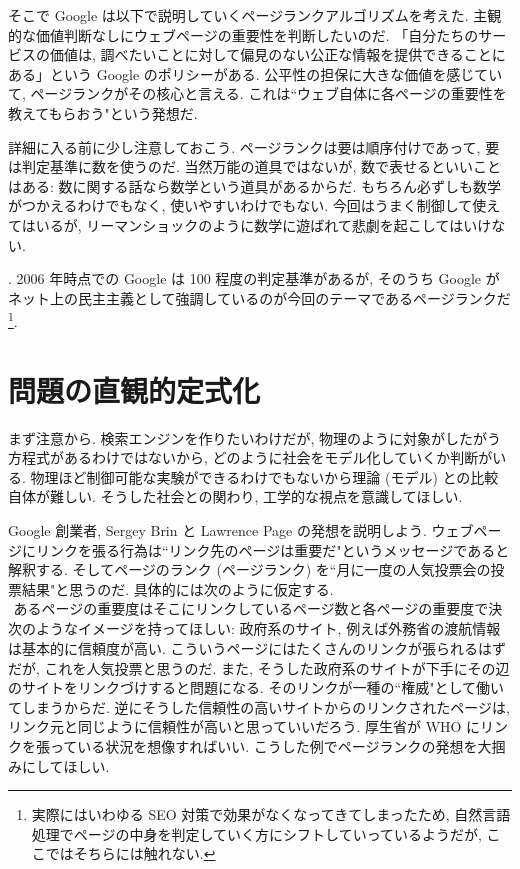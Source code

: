 \documentclass[openany, a4paper, oneside]{jsbook}
\begin{document}
{そこで Google は以下で説明していくページランクアルゴリズムを考えた.
主観的な価値判断なしにウェブページの重要性を判断したいのだ.
「自分たちのサービスの価値は, 調べたいことに対して偏見のない公正な情報を提供できることにある」という Google のポリシーがある.
公平性の担保に大きな価値を感じていて, ページランクがその核心と言える.
これは``ウェブ自体に各ページの重要性を教えてもらおう"という発想だ.

\begin{rem}
詳細に入る前に少し注意しておこう.
ページランクは要は順序付けであって, 要は判定基準に数を使うのだ.
当然万能の道具ではないが, 数で表せるといいことはある:
数に関する話なら数学という道具があるからだ.
もちろん必ずしも数学がつかえるわけでもなく, 使いやすいわけでもない.
今回はうまく制御して使えてはいるが,
リーマンショックのように数学に遊ばれて悲劇を起こしてはいけない.
\end{rem}}.
2006 年時点での Google は 100 程度の判定基準があるが,
そのうち Google がネット上の民主主義として強調しているのが今回のテーマであるページランクだ\footnote{実際にはいわゆる SEO 対策で効果がなくなってきてしまったため,
自然言語処理でページの中身を判定していく方にシフトしていっているようだが,
ここではそちらには触れない.}.
\section{問題の直観的定式化}

まず注意から.
検索エンジンを作りたいわけだが, 物理のように対象がしたがう方程式があるわけではないから,
どのように社会をモデル化していくか判断がいる.
物理ほど制御可能な実験ができるわけでもないから理論 (モデル) との比較自体が難しい.
そうした社会との関わり, 工学的な視点を意識してほしい.

Google 創業者, Sergey Brin と Lawrence Page の発想を説明しよう.
ウェブページにリンクを張る行為は``リンク先のページは重要だ"というメッセージであると解釈する.
そしてページのランク (ページランク) を``月に一度の人気投票会の投票結果"と思うのだ.
具体的には次のように仮定する.
\begin{align}
\text{あるページの重要度はそこにリンクしているページ数と各ページの重要度で決まる.}
\end{align}
次のようなイメージを持ってほしい:
政府系のサイト, 例えば外務省の渡航情報は基本的に信頼度が高い.
こういうページにはたくさんのリンクが張られるはずだが, これを人気投票と思うのだ.
また, そうした政府系のサイトが下手にその辺のサイトをリンクづけすると問題になる.
そのリンクが一種の``権威"として働いてしまうからだ.
逆にそうした信頼性の高いサイトからのリンクされたページは,
リンク元と同じように信頼性が高いと思っていいだろう.
厚生省が WHO にリンクを張っている状況を想像すればいい.
こうした例でページランクの発想を大掴みにしてほしい.
\end{document}
